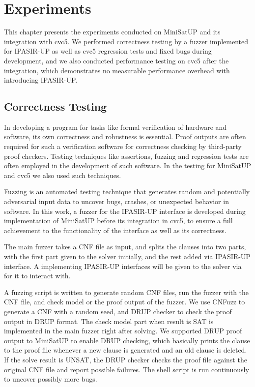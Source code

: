 \chapter{Experiments}

This chapter presents the experiments conducted on MiniSatUP and its integration with cvc5. We performed correctness testing by a fuzzer implemented for IPASIR-UP as well as cvc5 regression tests and fixed bugs during development, and we also conducted performance testing on cvc5 after the integration, which demonstrates no measurable performance overhead with introducing IPASIR-UP.

\section{Correctness Testing}

In developing a program for tasks like formal verification of hardware and software, its own correctness and robustness is essential. Proof outputs are often required for such a verification software for correctness checking by third-party proof checkers. Testing techniques like assertions, fuzzing and regression tests are often employed in the development of such software. In the testing for MiniSatUP and cvc5 we also used such techniques.

Fuzzing is an automated testing technique that generates random and potentially adversarial input data to uncover bugs, crashes, or unexpected behavior in software. In this work, a fuzzer for the IPASIR-UP interface is developed during implementation of MiniSatUP before its integration in cvc5, to ensure a full achievement to the functionality of the interface as well as its correctness.

The main fuzzer takes a CNF file as input, and splits the clauses into two parts, with the first part given to the solver initially, and the rest added via IPASIR-UP interface. A  implementing IPASIR-UP interfaces will be given to the solver via  for it to interact with.

A fuzzing script is written to generate random CNF files, run the fuzzer with the CNF file, and check model or the proof output of the fuzzer. We use CNFuzz \cite{BrummayerLonsingBiere-SAT10} to generate a CNF with a random seed, and DRUP checker \cite{6679408} to check the proof output in DRUP format. The check model part when result is SAT is implemented in the main fuzzer right after solving. We supported DRUP proof output to MiniSatUP to enable DRUP checking, which basically prints the clause to the proof file whenever a new clause is generated and an old clause is deleted. If the solve result is UNSAT, the DRUP checker checks the proof file against the original CNF file and report possible failures. The shell script is run continuously to uncover possibly more bugs.

